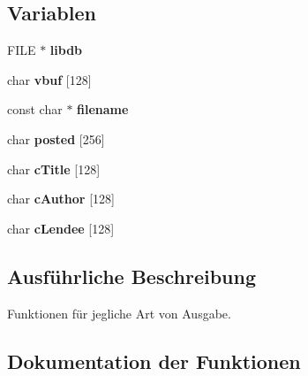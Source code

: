 \subsection*{Variablen}
\begin{DoxyCompactItemize}
\item 
F\+I\+LE $\ast$ {\bfseries libdb}\hypertarget{group___lend_lib_in_ga7eaa119ac9f04253a1f58bb6b09f9df2}{}\label{group___lend_lib_in_ga7eaa119ac9f04253a1f58bb6b09f9df2}

\item 
char {\bfseries vbuf} \mbox{[}128\mbox{]}\hypertarget{group___lend_lib_in_gaa4601e4145c1ddaec0cd8737710b6b42}{}\label{group___lend_lib_in_gaa4601e4145c1ddaec0cd8737710b6b42}

\item 
const char $\ast$ {\bfseries filename}\hypertarget{group___lend_lib_in_ga7efa5e9c7494c7d4586359300221aa5d}{}\label{group___lend_lib_in_ga7efa5e9c7494c7d4586359300221aa5d}

\item 
char {\bfseries posted} \mbox{[}256\mbox{]}\hypertarget{group___lend_lib_in_gae232d1b0328c97f6e77fb1a94660cb44}{}\label{group___lend_lib_in_gae232d1b0328c97f6e77fb1a94660cb44}

\item 
char {\bfseries c\+Title} \mbox{[}128\mbox{]}\hypertarget{group___lend_lib_in_ga315209623aaa2e9efc8a7a9a2220b98e}{}\label{group___lend_lib_in_ga315209623aaa2e9efc8a7a9a2220b98e}

\item 
char {\bfseries c\+Author} \mbox{[}128\mbox{]}\hypertarget{group___lend_lib_in_ga7c9df77d0b6c8b7a0da2c589149d72b7}{}\label{group___lend_lib_in_ga7c9df77d0b6c8b7a0da2c589149d72b7}

\item 
char {\bfseries c\+Lendee} \mbox{[}128\mbox{]}\hypertarget{group___lend_lib_in_ga0bf0e5c36ad41414ebe9a6e1b60d52dd}{}\label{group___lend_lib_in_ga0bf0e5c36ad41414ebe9a6e1b60d52dd}

\end{DoxyCompactItemize}


\subsection{Ausführliche Beschreibung}
Funktionen für jegliche Art von Ausgabe. 



\subsection{Dokumentation der Funktionen}
